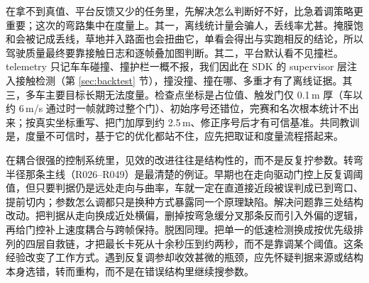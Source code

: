 \documentclass[UTF8,a4paper]{ctexart}
\begin{document}
在拿不到真值、平台反馈又少的任务里，先解决怎么判断好不好，比急着调策略更重要；这次的弯路集中在度量上。其一，离线统计量会骗人，丢线率尤甚。掩膜饱和会被记成丢线，草地并入路面也会扭曲它，单看会得出与实跑相反的结论，所以驾驶质量最终要靠接触日志和逐帧叠加图判断。其二，平台默认看不见撞栏。telemetry 只记车车碰撞、撞护栏一概不报，我们因此在 SDK 的 supervisor 层注入接触检测（第 \ref{sec:backtest} 节），撞没撞、撞在哪、多重才有了离线证据。其三，多车主要目标长期无法度量。检查点坐标是占位值、触发门仅 0.1\,m 厚（车以约 6\,m/s 通过时一帧就跨过整个门）、初始序号还错位，完赛和名次根本统计不出来；按真实坐标重写、把门加厚到约 2.5\,m、修正序号后才有可信基准。共同教训是，度量不可信时，基于它的优化都站不住，应先把取证和度量流程搭起来。

在耦合很强的控制系统里，见效的改进往往是结构性的，而不是反复拧参数。转弯半径那条主线（R026--R049）是最清楚的例证。早期也在走向驱动门控上反复调阈值，但只要判据仍是远处走向与曲率，车就一定在直道接近段被误判成已到弯口、提前切内；参数怎么调都只是换种方式暴露同一个原理缺陷。解决问题靠三处结构改动。把判据从走向换成近处横偏，删掉按弯急缓分叉那条反而引入外偏的逻辑，再给门控补上速度耦合与跨帧保持。脱困同理。把单一的低速检测换成按优先级排列的四层自救链，才把最长卡死从十余秒压到约两秒，而不是靠调某个阈值。这条经验改变了工作方式。遇到反复调参却收效甚微的瓶颈，应先怀疑判据来源或结构本身选错，转而重构，而不是在错误结构里继续搜参数。
\end{document}

